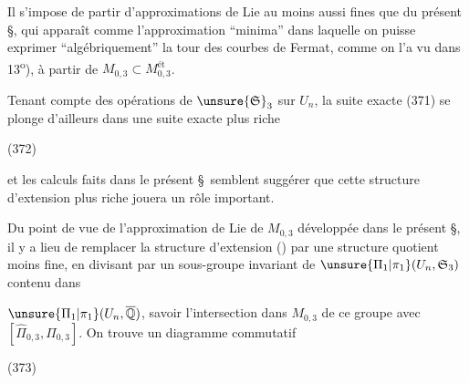 
Il s'impose de partir d'approximations de Lie au moins aussi fines que  du présent \S, qui apparaît comme l'approximation ``minima'' dans laquelle on puisse exprimer ``algébriquement'' la tour des courbes de Fermat,  comme on l'a vu dans 13\textsuperscript{o}), à partir de $M_{0,3}\subset M_{0,3}^{\text{ét}}$.

Tenant compte des opérations de $\unsure{\mathfrak S}_3$ sur $U_n$, la suite exacte (371) se plonge d'ailleurs dans une suite exacte plus riche

\noindent (372)

et les calculs faits dans le présent \S\ semblent suggérer que cette structure d'extension plus riche jouera un rôle important.

Du point de vue de l'approximation de Lie de $M_{0,3}$ développée dans le présent \S, il y a lieu de remplacer la structure d'extension () par une structure quotient moins fine, en divisant par un sous-groupe invariant de $\unsure{\Pi_1|\pi_1}(U_n,\mathfrak S_3)$ contenu dans


$\unsure{\Pi_1|\pi_1}(U_n,\overline{\mathbb Q})$, savoir l'intersection dans $M_{0,3}$ de ce groupe avec $[\widehat\Pi_{0,3},\widehat\Pi_{0,3}]$. On trouve un diagramme commutatif

\noindent (373)

